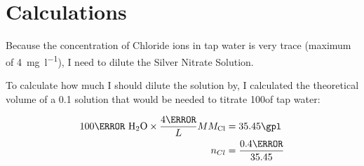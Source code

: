 \documentclass[12pt]{article}
\begin{document}
\centerline{}

\section*{Calculations}

Because the concentration of Chloride ions in tap water is very trace (maximum of \SI{4}{\mg\per\litre}), I need to dilute the Silver Nitrate Solution.

To calculate how much I should dilute the  solution by, I calculated the theoretical volume of a 0.1\mpl {} solution that would be needed to titrate 100\ml of tap water:

\begin{align*}
	100\ml~\ce{H2O} \times \frac{4\mg}{L} MM_{\ce{Cl}} & = 35.45\gpl
	\\
	n_{Cl}                                             & = \frac{0.4\mg}{35.45}
\end{align*}
\end{document}
